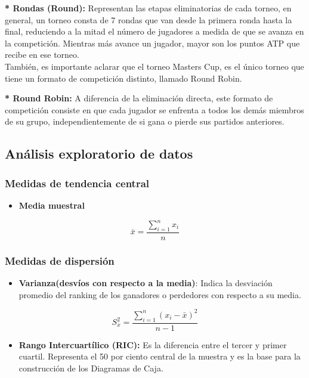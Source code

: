 \documentclass[oneside,11pt]{Latex/Classes/PhDthesisPSnPDF}
\begin{document}
\hfill\break

\textbf{* Rondas (Round):} Representan las etapas eliminatorias de cada
torneo, en general, un torneo consta de 7 rondas que van desde la
primera ronda hasta la final, reduciendo a la mitad el número de
jugadores a medida de que se avanza en la competición. Mientras más
avance un jugador, mayor son los puntos ATP que recibe en ese torneo.\\

También, es importante aclarar que el torneo Masters Cup, es el único
torneo que tiene un formato de competición distinto, llamado Round
Robin.

\textbf{* Round Robin:} A diferencia de la eliminación directa, este
formato de competición consiste en que cada jugador se enfrenta a todos
los demás miembros de su grupo, independientemente de si gana o pierde
sus partidos anteriores.

\subsection{Análisis exploratorio de datos}

\subsubsection{Medidas de tendencia central}

\begin{itemize}
\item \textbf{Media muestral}
\end{itemize}

\[\bar{x}=\frac{\sum_{i=1}^{n} x_i}{n} \]

\subsubsection{Medidas de dispersión}

\begin{itemize}
 \item \textbf{Varianza(desvíos con respecto a la media)}: Indica la desviación promedio del ranking de los ganadores o perdedores con respecto a su media.
\end{itemize}

\[S^2_x=\frac{\sum_{i=1}^{n}(x_i- \bar{x})^2} {n-1} \]

\begin{itemize}
 \item \textbf{ Rango Intercuartílico (RIC):} Es la diferencia entre el tercer y primer cuartil.
Representa el 50 por ciento central de la muestra y es la base para la construcción de los Diagramas de Caja.
\end{itemize}
\end{document}

